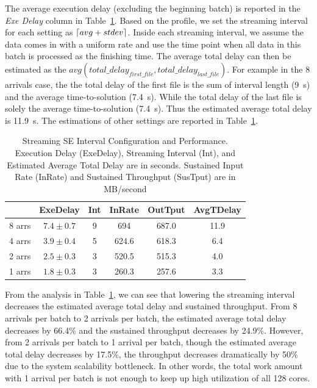 \documentclass[10pt,journal,compsoc]{IEEEtran}
\DeclarePairedDelimiter{\ceil}{\lceil}{\rceil}
\begin{document}
The average execution delay (excluding the beginning batch) is reported in the {\it Exe Delay} column in Table~\ref{tb:stream}.
Based on the profile, we set the streaming interval for each setting as $\ceil{avg+stdev}$.
Inside each streaming interval, we assume the data comes in with a uniform rate and use the time point
when all data in this batch is processed as the finishing time.
The average total delay can then be estimated as the $avg(total\_delay_{first\_file}, total\_delay_{last\_file})$.
For example in the 8 arrivals case, the the total delay of the first file is the sum of interval length (9~s) and 
the average time-to-solution (7.4~s). While the total delay of the last file is solely the average time-to-solution (7.4~s).
Thus the estimated average total delay is 11.9~s. The estimations of other settings are reported in Table~\ref{tb:stream}.
\begin{table}[h]
  \begin{center}
  \caption{Streaming SE Interval Configuration and Performance. Execution Delay (ExeDelay), Streaming Interval (Int), 
  and Estimated Average Total Delay are in seconds. 
  Sustained Input Rate (InRate) and Sustained Throughput (SusTput) are in MB/second}
    \begin{small}
    \begin{tabular}{ | c | c | c | c | c | c |}
    \hline
     & ExeDelay & Int  & InRate & OutTput & AvgTDelay\\ \hline \hline
    8 arrs & $7.4\pm0.7$ & 9 & 694 & 687.0 & 11.9\\ \hline
    4 arrs & $3.9\pm0.4$ & 5 & 624.6 & 618.3 & 6.4\\ \hline  
    2 arrs & $2.5\pm0.3$ & 3 & 520.5 & 515.3 & 4.0\\ \hline
    1 arrs & $1.8\pm0.3$ & 3 & 260.3 & 257.6 & 3.3\\ \hline
    \end{tabular}
    \end{small}   
  \label{tb:stream}     	
  \end{center}
\end{table}

From the analysis in Table~\ref{tb:stream}, we can see that lowering the streaming interval decreases
the estimated average total delay and sustained throughput.
From 8 arrivals per batch to 2 arrivals per batch, the estimated average total delay decreases by 66.4\%
and the sustained throughput decreases by 24.9\%. 
However, from 2 arrivals per batch to 1 arrival per batch, though the estimated average total delay decreases by 17.5\%,
the throughput decreases dramatically by 50\% due to the system scalability bottleneck.
In other words, the total work amount with 1 arrival per batch is not enough to keep up high utilization
of all 128 cores. 
\end{document}
